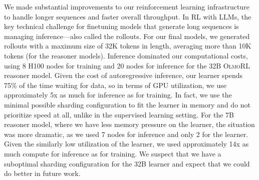 \documentclass[table]{ai2style/ai2}
\newcommand{\newOlmo}{Olmo\xspace}
\newcommand{\olmothreerl}{\textsc{\newOlmo{}RL}\xspace}
\begin{document}
We made substantial improvements to our reinforcement learning infrastructure to handle longer sequences and faster overall throughput.
In RL with LLMs, the key technical challenge for finetuning models that generate long sequences is managing inference---also called the rollouts.
For our final models, we generated rollouts with a maximum size of 32K tokens in length, averaging more than 10K tokens (for the reasoner models). Inference dominated our computational costs, using 8 H100 nodes for training and 20 nodes for inference for the 32B \olmothreerl reasoner model. Given the cost of autoregressive inference, our learner spends 75\% of the time waiting for data, so in terms of GPU utilization, we use approximately 5x as much for inference as for training. In fact, we use the minimal possible sharding configuration to fit the learner in memory and do not prioritize speed at all, unlike in the supervised learning setting. For the 7B reasoner model, where we have less memory pressure on the learner, the situation was more dramatic, as we used 7 nodes for inference and only 2 for the learner. Given the similarly low utilization of the learner, we used approximately 14x as much compute for inference as for training. We suspect that we have a suboptimal sharding configuration for the 32B learner and expect that we could do better in future work.
\end{document}
